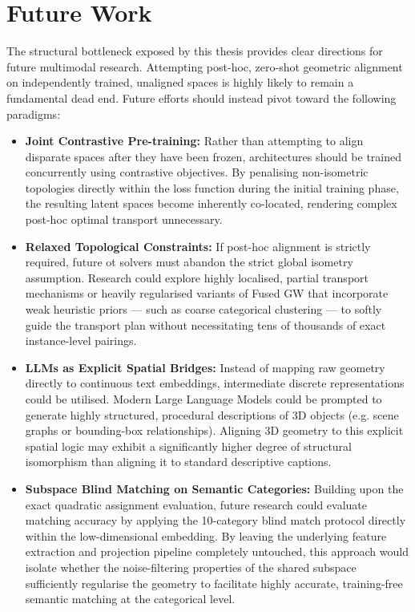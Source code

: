 \section{Future Work}
\label{sec:future_work}

The structural bottleneck exposed by this thesis provides clear directions for future multimodal research. Attempting post-hoc, zero-shot geometric alignment on independently trained, unaligned spaces is highly likely to remain a fundamental dead end. Future efforts should instead pivot toward the following paradigms:

\begin{itemize}
    \item \textbf{Joint Contrastive Pre-training:} Rather than attempting to align disparate spaces after they have been frozen, architectures should be trained concurrently using contrastive objectives. By penalising non-isometric topologies directly within the loss function during the initial training phase, the resulting latent spaces become inherently co-located, rendering complex post-hoc optimal transport unnecessary.

    \item \textbf{Relaxed Topological Constraints:} If post-hoc alignment is strictly required, future \gls{ot} solvers must abandon the strict global isometry assumption. Research could explore highly localised, partial transport mechanisms or heavily regularised variants of Fused GW that incorporate weak heuristic priors --- such as coarse categorical clustering --- to softly guide the transport plan without necessitating tens of thousands of exact instance-level pairings.

    \item \textbf{LLMs as Explicit Spatial Bridges:} Instead of mapping raw geometry directly to continuous text embeddings, intermediate discrete representations could be utilised. Modern Large Language Models could be prompted to generate highly structured, procedural descriptions of 3D objects (e.g. scene graphs or bounding-box relationships). Aligning 3D geometry to this explicit spatial logic may exhibit a significantly higher degree of structural isomorphism than aligning it to standard descriptive captions.

    \item \textbf{Subspace Blind Matching on Semantic Categories:} Building upon the exact quadratic assignment evaluation, future research could evaluate matching accuracy by applying the 10-category blind match protocol directly within the low-dimensional embedding. By leaving the underlying feature extraction and projection pipeline completely untouched, this approach would isolate whether the noise-filtering properties of the shared subspace sufficiently regularise the geometry to facilitate highly accurate, training-free semantic matching at the categorical level.
\end{itemize}

